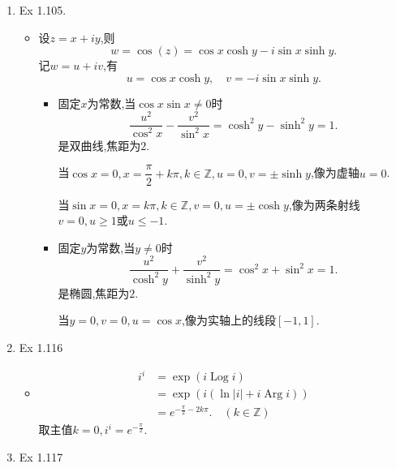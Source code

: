 \documentclass[12pt, a4paper]{article}
\begin{document}
\begin{enumerate}
\begin{proof}
\begin{align*}
            &= (\cos\theta + i\sin\theta)^3 \\
            &= \cos^3\theta + 3i\cos^2\theta\sin\theta - 3\cos\theta\sin^2\theta - i\sin^3\theta \\
            &= (\cos^3\theta - 3\cos\theta\sin^2\theta) + i(3\cos^2\theta\sin\theta - \sin^3\theta).
        \end{align*}
        \begin{align*}
            \tan 3\theta &= \frac{\sin 3\theta}{\cos 3\theta} \\
            &= \frac{3\cos^2\theta\sin\theta - \sin^3\theta}{\cos^3\theta - 3\cos\theta\sin^2\theta} \\
            &= \frac{\frac{3\cos^2\theta\sin\theta - \sin^3\theta}{\cos^3\theta}}{\frac{\cos^3\theta - 3\cos\theta\sin^2\theta}{\cos^3\theta}} \\
            &= \frac{3T - T^3}{1 - 3T^2} \quad (T = \tan\theta).
        \end{align*}
    \end{proof}
    \item Ex 1.105. \label{ex:1.105}
    \begin{itemize}
        \item[解] 设\(z = x + iy\),则
        \[w = \cos(z) = \cos x\cosh y - i\sin x\sinh y.\]
        记\(w = u + iv\),有
        \[u = \cos x\cosh y, \quad v = -i\sin x\sinh y.\]
        \begin{itemize}
            \item 固定\(x\)为常数,当\(\cos x \sin x \neq 0\)时
            \[\frac{u^2}{\cos^2 x} - \frac{v^2}{\sin^2 x} = \cosh^2y - \sinh^2y = 1.\]
            是双曲线,焦距为\(2\).

            当\(\cos x = 0, x = \dfrac{\pi}{2} + k\pi, k \in \mathbb{Z}, u = 0, v = \pm \sinh y\),像为虚轴\(u = 0\).

            当\(\sin x = 0, x = k\pi, k \in \mathbb{Z}, v = 0, u = \pm \cosh y\),像为两条射线\(v = 0, u \geq 1 \text{或} u \leq -1\).
            \item 固定\(y\)为常数,当\(y \neq 0\)时
            \[\frac{u^2}{\cosh^2 y} + \frac{v^2}{\sinh^2 y} = \cos^2 x + \sin^2 x = 1.\]
            是椭圆,焦距为\(2\).

            当\(y = 0, v = 0, u = \cos x\),像为实轴上的线段\([-1, 1]\).
        \end{itemize}
    \end{itemize}
    \item Ex 1.116 \label{ex:1.116}
    \begin{itemize}
        \item[解] \begin{align*}
            i^i &= \exp(i\operatorname{Log} i) \\
            &= \exp(i(\ln|i| + i\operatorname{Arg} i)) \\
            &= e^{-\frac{\pi}{2} - 2k\pi}. \quad (k \in \mathbb{Z})
        \end{align*}
        取主值\(k = 0, i^i = e^{-\frac{\pi}{2}}\).
    \end{itemize}
    \item Ex 1.117 \label{ex:1.117}


\end{enumerate}
\end{document}
